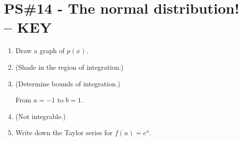 


%


\allowdisplaybreaks
\section{PS\#14 - The normal distribution! -- {\color{red} KEY} }

\everymath{\displaystyle}
\begin{enumerate}[leftmargin=0pt]
    \item Draw a graph of $p(x)$. 
    \item (Shade in the region of integration.)
    
    \item (Determine bounds of integration.) \begin{red} From $a=-1$ to $b=1$.
    \end{red}
    \item (Not integrable.)
    \item Write down the Taylor series for $f(u) = e^u$.
    

\end{enumerate}
